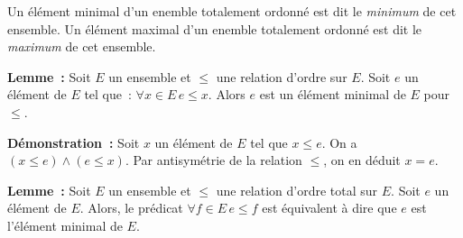    \done 

\medskip

Un élément minimal d'un enemble totalement ordonné est dit le \textit{minimum} de cet ensemble.
Un élément maximal d'un enemble totalement ordonné est dit le \textit{maximum} de cet ensemble.

\medskip

\noindent\textbf{Lemme :} Soit $E$ un ensemble et $\leq$ une relation d'ordre sur $E$. 
    Soit $e$ un élément de $E$ tel que : $\forall x \in E \, e \leq x$. 
    Alors $e$ est un élément minimal de $E$ pour $\leq$.

\medskip

\noindent\textbf{Démonstration :} 
    Soit $x$ un élément de $E$ tel que $x \leq e$. 
    On a $(x \leq e) \wedge (e \leq x)$. 
    Par antisymétrie de la relation $\leq$, on en déduit $x = e$.

   \done 

\medskip

\noindent\textbf{Lemme :} Soit $E$ un ensemble et $\leq$ une relation d'ordre total sur $E$. 
    Soit $e$ un élément de $E$.
    Alors, le prédicat $\forall f \in E \, e \leq f$ est équivalent à dire que $e$ est l'élément minimal de $E$.

\medskip

